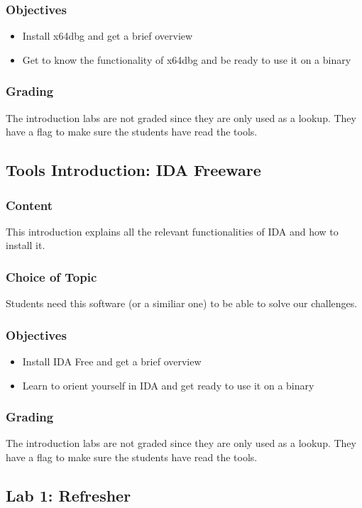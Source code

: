 \subsubsection*{Objectives}
\begin{itemize}
    \item Install x64dbg and get a brief overview
    \item Get to know the functionality of x64dbg and be ready to use it on a binary
\end{itemize}
\subsubsection*{Grading}
The introduction labs are not graded since they are only used as a lookup. They have a flag to make sure the students have read the tools.

\subsection{Tools Introduction: IDA Freeware}
\subsubsection*{Content}
This introduction explains all the relevant functionalities of IDA and how to install it.
\subsubsection*{Choice of Topic}
Students need this software (or a similiar one) to be able to solve our challenges.
\subsubsection*{Objectives}
\begin{itemize}
    \item Install IDA Free and get a brief overview
    \item Learn to orient yourself in IDA and get ready to use it on a binary
\end{itemize}
\subsubsection*{Grading}
The introduction labs are not graded since they are only used as a lookup. They have a flag to make sure the students have read the tools.

\subsection{Lab 1: Refresher}
